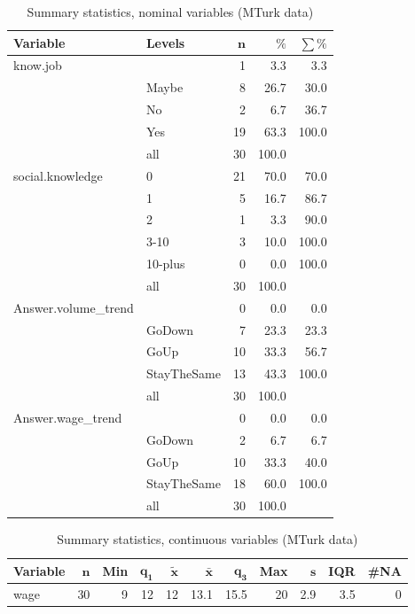 \documentclass[a4paper,10pt]{article}\usepackage[]{graphicx}\usepackage[]{color}
\begin{document}
\begin{table}[ht]
\centering
{\footnotesize
\begin{tabular}{ll|rrr}
 \textbf{Variable} & \textbf{Levels} & $\mathbf{n}$ & $\mathbf{\%}$ & $\mathbf{\sum \%}$ \\ 
  \hline
know.job &  & 1 & 3.3 & 3.3 \\ 
   & Maybe & 8 & 26.7 & 30.0 \\ 
   & No & 2 & 6.7 & 36.7 \\ 
   & Yes & 19 & 63.3 & 100.0 \\ 
   \hline
 & all & 30 & 100.0 &  \\ 
   \hline
\hline
social.knowledge & 0 & 21 & 70.0 & 70.0 \\ 
   & 1 & 5 & 16.7 & 86.7 \\ 
   & 2 & 1 & 3.3 & 90.0 \\ 
   & 3-10 & 3 & 10.0 & 100.0 \\ 
   & 10-plus & 0 & 0.0 & 100.0 \\ 
   \hline
 & all & 30 & 100.0 &  \\ 
   \hline
\hline
Answer.volume\_trend &  & 0 & 0.0 & 0.0 \\ 
   & GoDown & 7 & 23.3 & 23.3 \\ 
   & GoUp & 10 & 33.3 & 56.7 \\ 
   & StayTheSame & 13 & 43.3 & 100.0 \\ 
   \hline
 & all & 30 & 100.0 &  \\ 
   \hline
\hline
Answer.wage\_trend &  & 0 & 0.0 & 0.0 \\ 
   & GoDown & 2 & 6.7 & 6.7 \\ 
   & GoUp & 10 & 33.3 & 40.0 \\ 
   & StayTheSame & 18 & 60.0 & 100.0 \\ 
   \hline
 & all & 30 & 100.0 &  \\ 
   \hline
\hline
\end{tabular}
}
\caption{Summary statistics, nominal variables (MTurk data)} 
\label{tab1:43-5070}
\end{table}
\begin{table}[ht]
\centering
{\footnotesize
\begin{tabular}{lrrrrrrrrrr}
 \textbf{Variable} & $\mathbf{n}$ & \textbf{Min} & $\mathbf{q_1}$ & $\mathbf{\widetilde{x}}$ & $\mathbf{\bar{x}}$ & $\mathbf{q_3}$ & \textbf{Max} & $\mathbf{s}$ & \textbf{IQR} & \textbf{\#NA} \\ 
  \hline
wage & 30 & 9 & 12 & 12 & 13.1 & 15.5 & 20 & 2.9 & 3.5 & 0 \\ 
  \end{tabular}
}
\caption{Summary statistics, continuous variables (MTurk data)} 
\label{tab2:43-5070}
\end{table}
\end{document}
